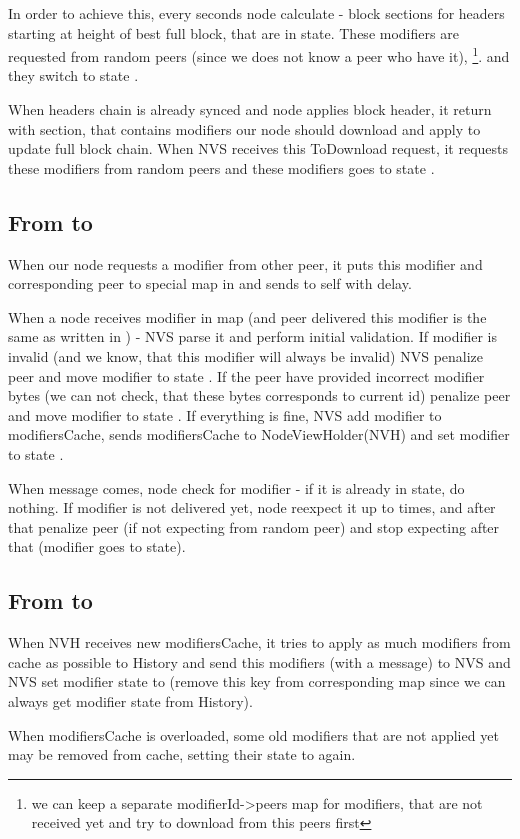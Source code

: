 In order to achieve this, every  seconds node calculate  -
block sections for headers starting at height of best full block, that are in  state.
These modifiers are requested from random peers (since we does not know a peer who have it),
\footnote{we can keep a separate modifierId->peers map for modifiers, that are not received yet and try to download from this peers first}.
and they switch to state .

When headers chain is already synced and node applies block header, it return  with  section,
that contains modifiers our node should download and apply to update full block chain.
When NVS receives this ToDownload request, it requests these modifiers from random peers
and these modifiers goes to state .

\subsection{From  to }

When our node requests a modifier from other peer, it puts this modifier and
corresponding peer to special map  in  and sends  to self
with  delay.

When a node receives modifier in  map
(and peer delivered this modifier is the same as written in ) -
NVS parse it and perform initial validation.
If modifier is invalid (and we know, that this modifier will always be invalid) NVS penalize peer and move modifier to state .
If the peer have provided incorrect modifier bytes (we can not check,
that these bytes corresponds to current id) penalize peer and move modifier to state .
If everything is fine, NVS add modifier to modifiersCache, sends modifiersCache to
NodeViewHolder(NVH) and set modifier to state .

When  message comes, node check for modifier - if it is already in  state,
do nothing.
If modifier is not delivered yet, node reexpect it up to  times, and after that
penalize peer (if not expecting from random peer) and stop expecting after that (modifier goes to  state).

\subsection{From  to }

When NVH receives new modifiersCache, it tries to apply as much modifiers from cache as possible to History
and send this modifiers (with a  message) to NVS and NVS set modifier
state to  (remove this key from corresponding map since we can always get modifier state from History).

When modifiersCache is overloaded, some old modifiers that are not applied yet may be removed from cache, setting
their state to  again.